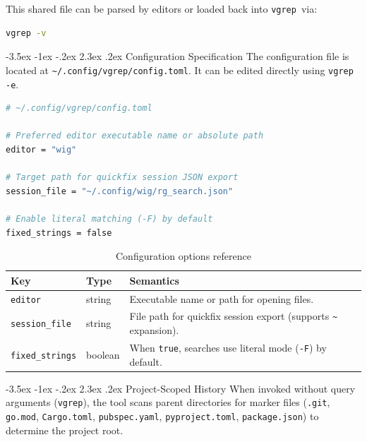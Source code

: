 \documentclass[11pt,a4paper]{article}
\makeatletter
\newcommand{\toolname}{\texttt{vgrep}}
\renewcommand{\section}{\@startsection{section}{1}{\z@}%
  {-3.5ex \@plus -1ex \@minus -.2ex}%
  {2.3ex \@plus .2ex}%
  {\normalfont\Large\bfseries\color{MidnightBlue}}}
\makeatother
\begin{document}
This shared file can be parsed by editors or loaded back into \toolname\ via:
\begin{lstlisting}[language=bash]
vgrep -v
\end{lstlisting}

\section{Configuration Specification}
The configuration file is located at \texttt{\textasciitilde/.config/vgrep/config.toml}. It can be edited directly using \texttt{vgrep -e}.

\begin{lstlisting}[language=bash]
# ~/.config/vgrep/config.toml

# Preferred editor executable name or absolute path
editor = "wig"

# Target path for quickfix session JSON export
session_file = "~/.config/wig/rg_search.json"

# Enable literal matching (-F) by default
fixed_strings = false
\end{lstlisting}

\begin{table}[h!]
\centering
\small
\begin{tabularx}{\textwidth}{llX}
\toprule
\textbf{Key} & \textbf{Type} & \textbf{Semantics} \\
\midrule
\texttt{editor} & string & Executable name or path for opening files. \\
\texttt{session\_file} & string & File path for quickfix session export (supports \texttt{\textasciitilde} expansion). \\
\texttt{fixed\_strings} & boolean & When \texttt{true}, searches use literal mode (\texttt{-F}) by default. \\
\bottomrule
\end{tabularx}
\caption{Configuration options reference}
\end{table}

\section{Project-Scoped History}
When invoked without query arguments (\texttt{vgrep}), the tool scans parent directories for marker files (\texttt{.git}, \texttt{go.mod}, \texttt{Cargo.toml}, \texttt{pubspec.yaml}, \texttt{pyproject.toml}, \texttt{package.json}) to determine the project root.
\end{document}
